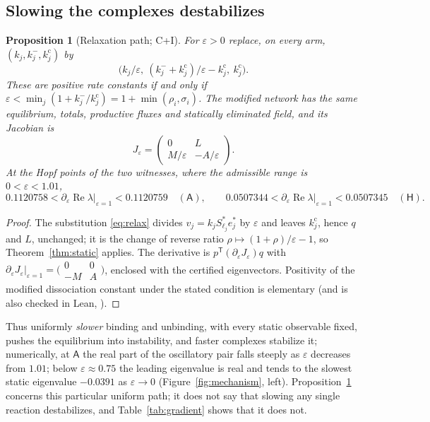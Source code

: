 \documentclass[11pt,a4paper]{article}
\theoremstyle{plain}
\newtheorem{proposition}[theorem]{Proposition}
\theoremstyle{definition}
\theoremstyle{remark}
\newcommand{\T}{\mathsf T}
\newcommand{\WA}{\mathsf A}
\newcommand{\WH}{\mathsf H}
\DeclareMathOperator{\Ree}{Re}
\newcommand{\evC}{\textsf{C}}
\newcommand{\evI}{\textsf{I}}
\begin{document}
\subsection{Slowing the complexes destabilizes}
\begin{proposition}[Relaxation path; \evC+\evI]\label{prop:relax}
For $\varepsilon>0$ replace, on every arm, $(k_j,k_j^{-},k_j^{\mathrm c})$ by
\begin{equation}\label{eq:relax}
 \bigl(k_j/\varepsilon,\ (k_j^{-}+k_j^{\mathrm c})/\varepsilon-k_j^{\mathrm c},\ k_j^{\mathrm c}\bigr).
\end{equation}
These are positive rate constants if and only if $\varepsilon<\min_j(1+k_j^-/k_j^{\mathrm c})=1+\min(\rho_i,\sigma_i)$. The modified network has the same equilibrium, totals, productive fluxes and statically eliminated field, and its Jacobian is
\[
 J_\varepsilon=\begin{pmatrix}0&L\\ M/\varepsilon&-A/\varepsilon\end{pmatrix}.
\]
At the Hopf points of the two witnesses, where the admissible range is $0<\varepsilon<1.01$,
\[
 0.1120758<\partial_\varepsilon\Ree\lambda\big|_{\varepsilon=1}<0.1120759\quad(\WA),\qquad
 0.0507344<\partial_\varepsilon\Ree\lambda\big|_{\varepsilon=1}<0.0507345\quad(\WH).
\]
\end{proposition}
\begin{proof}
The substitution \eqref{eq:relax} divides $v_j=k_jS^*_{\ell_j}e_j^*$ by $\varepsilon$ and leaves $k_j^{\mathrm c}$, hence $q$ and $L$, unchanged; it is the change of reverse ratio $\rho\mapsto(1+\rho)/\varepsilon-1$, so Theorem~\ref{thm:static} applies. The derivative is $p^{\T}(\partial_\varepsilon J_\varepsilon)q$ with $\partial_\varepsilon J_\varepsilon|_{\varepsilon=1}=\bigl(\begin{smallmatrix}0&0\\-M&A\end{smallmatrix}\bigr)$, enclosed with the certified eigenvectors. Positivity of the modified dissociation constant under the stated condition is elementary (and is also checked in Lean, ).
\end{proof}
Thus uniformly \emph{slower} binding and unbinding, with every static observable fixed, pushes the equilibrium into instability, and faster complexes stabilize it; numerically, at $\WA$ the real part of the oscillatory pair falls steeply as $\varepsilon$ decreases from $1.01$; below $\varepsilon\approx0.75$ the leading eigenvalue is real and tends to the slowest static eigenvalue $-0.0391$ as $\varepsilon\to0$ (Figure~\ref{fig:mechanism}, left). Proposition~\ref{prop:relax} concerns this particular uniform path; it does not say that slowing any single reaction destabilizes, and Table~\ref{tab:gradient} shows that it does not.
\end{document}
